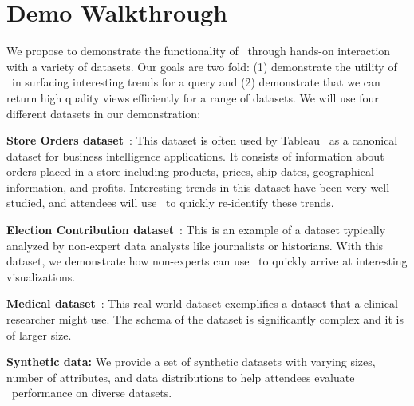 \vspace{-2mm}
\section{Demo Walkthrough}
\label{sec:demo-walkthrough}
 
We propose to demonstrate the functionality of \SeeDB\ through hands-on
interaction with a variety of datasets. Our goals are two fold: (1) demonstrate
the utility of \SeeDB\ in surfacing interesting trends for a query
and (2) demonstrate that we can return high quality views efficiently for
a range of datasets. We will use four different datasets in our demonstration:

\begin{denselist}
  \item {\bf Store Orders dataset}~\cite{superstore}: This dataset is
    often used by Tableau~\cite{tableau} as a canonical dataset for
    business intelligence applications. It consists of information
    about orders placed in a store including products, prices, ship
    dates, geographical information, and profits. Interesting trends in
    this dataset have been very well studied, and attendees will use
    \SeeDB\ to quickly re-identify these trends. 
  \item {\bf Election Contribution dataset}~\cite{election_data}: This
  is an example of a dataset typically analyzed by
    non-expert data analysts like journalists or historians. With this
    dataset, we demonstrate how non-experts can use \SeeDB\ to quickly
    arrive at interesting visualizations.
  \item {\bf Medical dataset}~\cite{mimic}: This real-world dataset exemplifies
  a dataset that a clinical researcher might use. The schema of the dataset is
  significantly complex and it is of larger size.  
    \item {\bf Synthetic data:} We provide a set of synthetic datasets with
    varying sizes, number of attributes, and data distributions to help
    attendees evaluate \SeeDB\ performance on diverse datasets.
\end{denselist}

